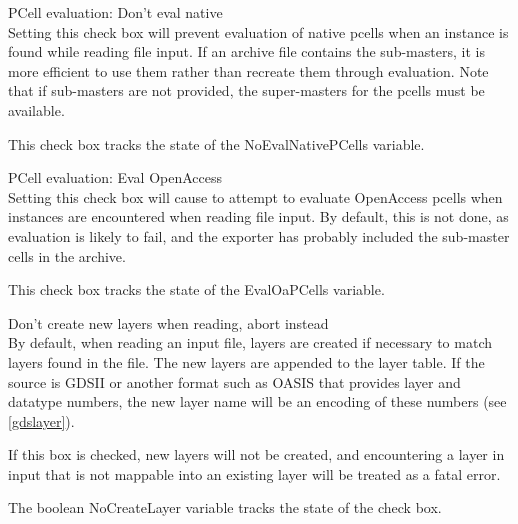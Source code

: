 \begin{description}

\item{\cb PCell evaluation:  Don't eval native}\\
Setting this check box will prevent evaluation of native pcells when
an instance is found while reading file input.  If an archive file
contains the sub-masters, it is more efficient to use them rather than
recreate them through evaluation.  Note that if sub-masters are not
provided, the super-masters for the pcells must be available.
 
This check box tracks the state of the {\et NoEvalNativePCells}
variable.
 
\ifoa
\item{\cb PCell evaluation:  Eval OpenAccess}\\
Setting this check box will cause {\Xic} to attempt to evaluate
OpenAccess pcells when instances are encountered when reading file
input.  By default, this is not done, as evaluation is likely to fail,
and the exporter has probably included the sub-master cells in the
archive.

This check box tracks the state of the {\et EvalOaPCells} variable. 
\fi

\item{\cb Don't create new layers when reading, abort instead}\\
By default, when reading an input file, layers are created if
necessary to match layers found in the file.  The new layers are
appended to the layer table.  If the source is GDSII or another format
such as OASIS that provides layer and datatype numbers, the new layer
name will be an encoding of these numbers (see \ref{gdslayer}).

If this box is checked, new layers will not be created, and
encountering a layer in input that is not mappable into an existing
{\Xic} layer will be treated as a fatal error.

The boolean {\et NoCreateLayer} variable tracks the state of the check
box.


\end{description}
